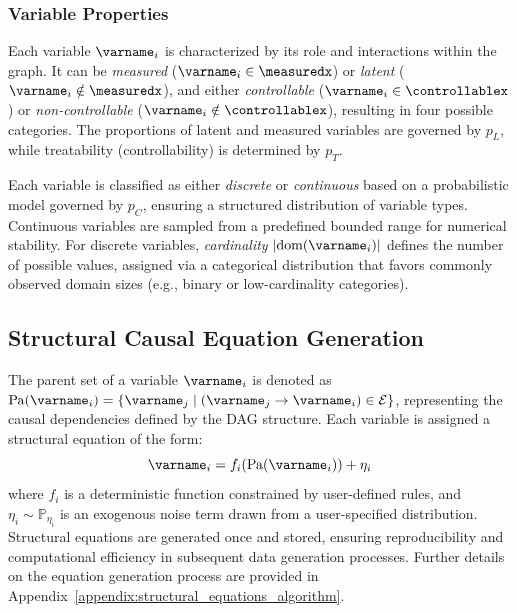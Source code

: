 \documentclass{uai2024} %
\newcommand{\pl}{p_L} %
\newcommand{\pt}{p_T} %
\newcommand{\pc}{p_C} %
\begin{document}
        \subsubsection{Variable Properties}  
            Each variable $ \varname_i $ is characterized by its role and interactions within the graph.  
            It can be \emph{measured} ($ \varname_i \in \measuredx $) or \emph{latent} ($ \varname_i \notin \measuredx $), and either \emph{controllable} ($ \varname_i \in \controllablex $) or \emph{non-controllable} ($ \varname_i \notin \controllablex $), resulting in four possible categories.  
            The proportions of latent and measured variables are governed by $ \pl $, while treatability (controllability) is determined by $ \pt $.  
            
            Each variable is classified as either \emph{discrete} or \emph{continuous} based on a probabilistic model governed by $ \pc $, ensuring a structured distribution of variable types.  
            Continuous variables are sampled from a predefined bounded range for numerical stability.  
            For discrete variables, \emph{cardinality} $ |\text{dom}(\varname_i)| $ defines the number of possible values, assigned via a categorical distribution that favors commonly observed domain sizes (e.g., binary or low-cardinality categories).  



    \subsection{Structural Causal Equation Generation}
        The parent set of a variable $ \varname_i $ is denoted as $ \text{Pa}(\varname_i) = \{ \varname_j \mid (\varname_j \to \varname_i) \in \mathcal{E} \} $, representing the causal dependencies defined by the DAG structure. 
        Each variable is assigned a structural equation of the form:
        \begin{equation*}
            \varname_i = f_i(\text{Pa}(\varname_i)) + \eta_i
        \end{equation*}
        where $ f_i $ is a deterministic function constrained by user-defined rules, and $ \eta_i \sim \mathbb{P}_{\eta_i} $ is an exogenous noise term drawn from a user-specified distribution. 
        Structural equations are generated once and stored, ensuring reproducibility and computational efficiency in subsequent data generation processes. 
        Further details on the equation generation process are provided in Appendix~\ref{appendix:structural_equations_algorithm}.
\end{document}
